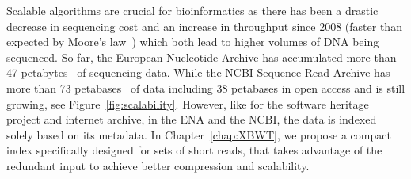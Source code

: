 Scalable algorithms are crucial for bioinformatics as there has been a drastic decrease in sequencing cost and an increase in throughput since 2008 (faster than expected by Moore's law~\cite{muir2016real}) which both lead to higher volumes of DNA being sequenced. 
So far, the European Nucleotide Archive has accumulated more than 47 petabytes~\cite{ena} of sequencing data.
While the NCBI Sequence Read Archive has more than 73 petabases~\cite{sra} of data including 38 petabases in open access and is still growing, see Figure~\ref{fig:scalability}. However, like for the software heritage project and internet archive, in the ENA and the NCBI, the data is indexed solely based on its metadata.
In Chapter~\ref{chap:XBWT}, we propose a compact index specifically designed for sets of short reads, that takes advantage of the redundant input to achieve better compression and scalability. 


